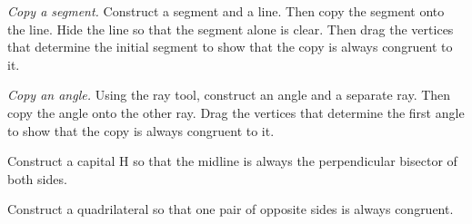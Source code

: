 \begin{prob}
\emph{Copy a segment.}  Construct a segment and a line.  Then copy the segment onto the line.  Hide the line so that the segment alone is clear.  Then drag the vertices that determine the initial segment to show that the copy is always congruent to it.  
\end{prob}

\begin{prob}
\emph{Copy an angle.}  Using the ray tool, construct an angle and a separate ray.  Then copy the angle onto the other ray.  Drag the vertices that determine the first angle to show that the copy is always congruent to it.  
\end{prob}

\begin{prob}
Construct a capital H so that the midline is always the perpendicular bisector of both sides.  
\end{prob}

\begin{prob}
Construct a quadrilateral so that one pair of opposite sides is always congruent.  
\end{prob}





